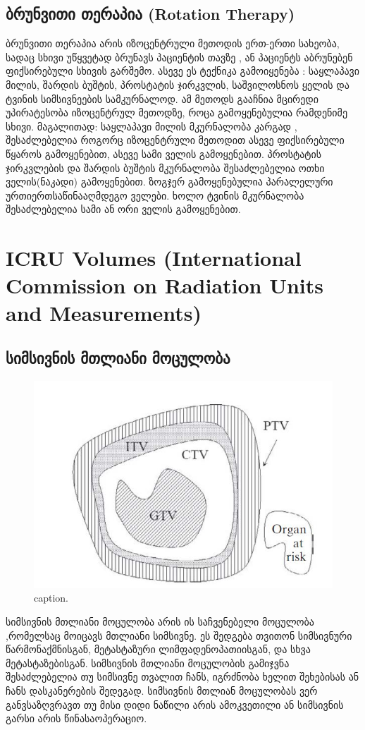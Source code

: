 \documentclass[12pt,a4paper,]{report}
\begin{document}
\section{ბრუნვითი თერაპია (Rotation Therapy)}
ბრუნვითი თერაპია არის იზოცენტრული მეთოდის ერთ-ერთი სახეობა, სადაც სხივი უწყვეტად ბრუნავს პაციენტის თავზე , ან პაციენტს აბრუნებენ ფიქსირებული სხივის გარშემო. ასევე ეს ტექნიკა გამოიყენება : საყლაპავი მილის, შარდის ბუშტის, პროსტატის ჯირკვლის, საშვილოსნოს ყელის და ტვინის სიმსივნეების სამკურნალოდ.  ამ მეთოდს გააჩნია მცირედი უპირატესობა იზოცენტრულ მეთოდზე, როცა გამოყენებულია რამდენიმე სხივი. მაგალითად: საყლაპავი მილის მკურნალობა კარგად , შესაძლებელია როგორც იზოცენტრული მეთოდით ასევე ფიქსირებული წყაროს გამოყენებით, ასევე სამი ველის გამოყენებით.  პროსტატის ჯირკვლების და შარდის ბუშტის მკურნალობა შესაძლებელია ოთხი ველის(ნაკადი) გამოყენებით.  ზოგჯერ გამოყენებულია პარალელური ურთიერთსაწინააღმდეგო ველები. ხოლო ტვინის მკურნალობა შესაძლებელია სამი ან ორი ველის გამოყენებით.

\chapter{ICRU Volumes (International Commission on Radiation Units and Measurements)}
\section{სიმსივნის მთლიანი მოცულობა}

	\begin{figure}
	    \centering
        \includegraphics[width=.7\linewidth]{images/gross_tumor_volume}
        \caption{caption.}
    \end{figure}

სიმსივნის მთლიანი მოცულობა არის ის საჩვენებელი მოცულობა ,რომელსაც მოიცავს მთლიანი სიმსივნე. ეს შედგება თვითონ სიმსივნური წარმონაქმნისგან, მეტასტაზური ლიმფადენოპათიისგან,  და სხვა მეტასტაზებისგან. სიმსივნის მთლიანი მოცულობის გამიჯვნა შესაძლებელია თუ სიმსივნე თვალით ჩანს, იგრძნობა ხელით შეხებისას ან ჩანს დასკანერების შედეგად. სიმსივნის მთლიან მოცულობას ვერ განვსაზღვრავთ თუ მისი დიდი ნაწილი არის ამოკვეთილი ან სიმსივნის გარსი არის წინასაოპერაციო. 
\end{document}
